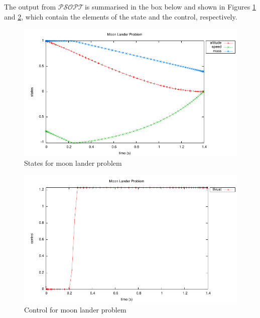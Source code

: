 \documentclass[a4paper,11pt]{report}    %
\newcommand{\psopt}{$\mathcal{PSOPT}$\,}  %
\newenvironment{shadedframe}{%
  \def\FrameCommand{\fcolorbox{black}{shadecolor}}%
  \MakeFramed {\FrameRestore}}
{\endMakeFramed}
\begin{document}
\tiny
\begin{shadedframe}

\end{shadedframe}
\normalsize

The output from \psopt is summarised in the box below and shown in Figures \ref{fig:moon_states} and \ref{fig:moon_control}, which contain the elements
of the state and the control, respectively.

\begin{shadedframe}

\end{shadedframe}

\begin{figure}
  \centering 
  \includegraphics{../examples/moon/moon_states}
  \caption{States for moon lander problem}
 \label{fig:moon_states}
\end{figure}


\begin{figure}
  \centering
  \includegraphics{../examples/moon/moon_control}
  \caption{Control for moon lander problem}
 \label{fig:moon_control}
\end{figure}
\end{document}
